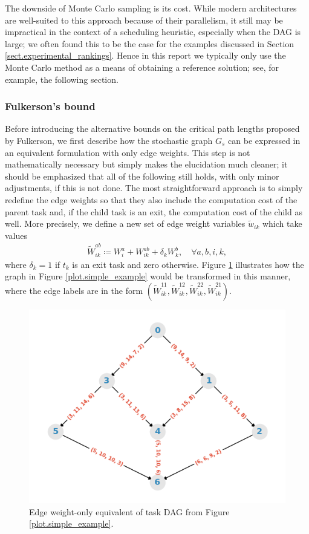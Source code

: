 \documentclass[12pt]{article}
\begin{document}
The downside of Monte Carlo sampling is its cost. While modern architectures are well-suited to this approach because of their parallelism, it still may be impractical in the context of a scheduling heuristic, especially when the DAG is large; we often found this to be the case for the examples discussed in Section \ref{sect.experimental_rankings}. Hence in this report we typically only use the Monte Carlo method as a means of obtaining a reference solution; see, for example, the following section. 

\subsubsection{Fulkerson's bound}
\label{subsubsect.fulkerson}

Before introducing the alternative bounds on the critical path lengths proposed by Fulkerson, we first describe how the stochastic graph $G_s$ can be expressed in an equivalent formulation with only edge weights. This step is not mathematically necessary but simply makes the elucidation much cleaner; it should be emphasized that all of the following still holds, with only minor adjustments, if this is not done. The most straightforward approach is to simply redefine the edge weights so that they also include the computation cost of the parent task and, if the child task is an exit, the computation cost of the child as well. More precisely, we define a new set of edge weight variables $\tilde{w}_{ik}$ which take values 
\begin{align*}
\tilde{W}_{ik}^{ab} \coloneqq W_i^a + W_{ik}^{ab} + \delta_k W_k^b,  \quad \forall a, b, i, k, 
\end{align*}
where $\delta_k = 1$ if $t_k$ is an exit task and zero otherwise. Figure \ref{plot.example_edge_only} illustrates how the graph in Figure \ref{plot.simple_example} would be transformed in this manner, where the edge labels are in the form $(\tilde{W}_{ik}^{11}, \tilde{W}_{ik}^{12}, \tilde{W}_{ik}^{22}, \tilde{W}_{ik}^{21})$.

\begin{figure}
	\centering	
	\includegraphics[scale=0.8]{simple_graph_edge_only.png}
	\caption{Edge weight-only equivalent of task DAG from Figure \ref{plot.simple_example}.}	
	\label{plot.example_edge_only}
\end{figure} 
\end{document}
